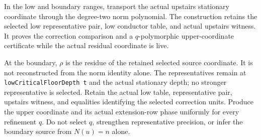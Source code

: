 \begin{theorem}
\label{mod:cases-wildquadratic-lowcoordinatetransport}
In the low and boundary ranges, transport the actual upstairs stationary
coordinate through the degree-two norm polynomial.  The construction retains
the selected low representative pair, low conductor table, and actual
upstairs witness.  It proves the correction comparison and a
\(q\)-polymorphic upper-coordinate certificate while the actual residual
coordinate is live.

At the boundary, \(\rho\) is the residue of the retained selected source
coordinate.  It is not reconstructed from the norm identity alone.  The
representatives remain at \texttt{lowCriticalFloorDepth t} and the actual
stationary depth; no stronger representative is selected.
\leanok
{}
\FormalizationContract
Retain the actual low table, representative pair, upstairs witness, and
equalities identifying the selected correction units.  Produce the upper
coordinate and its actual extension-row phase uniformly for every refinement
\(q\).  Do not select \(q\), strengthen representative precision, or infer the
boundary source from \(N(u)=n\) alone.
\end{theorem}
